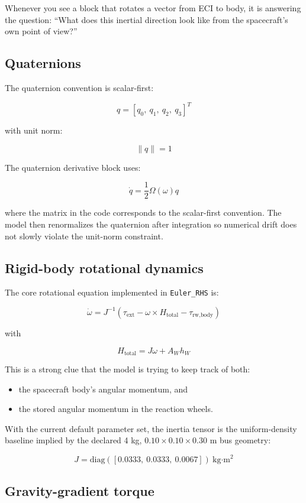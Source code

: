 \documentclass[11pt]{article}
\begin{document}
Whenever you see a block that rotates a vector from ECI to body, it is answering the question: ``What does this inertial direction look like from the spacecraft's own point of view?''

\subsection{Quaternions}

The quaternion convention is scalar-first:

\[
q = [q_0,\ q_1,\ q_2,\ q_3]^T
\]

with unit norm:

\[
\|q\| = 1
\]

The quaternion derivative block uses:

\[
\dot{q} = \frac{1}{2}\Omega(\omega)q
\]

where the matrix in the code corresponds to the scalar-first convention. The model then renormalizes the quaternion after integration so numerical drift does not slowly violate the unit-norm constraint.

\subsection{Rigid-body rotational dynamics}

The core rotational equation implemented in \texttt{Euler\_RHS} is:

\[
\dot{\omega} = J^{-1}\left(\tau_{\text{ext}} - \omega \times H_{\text{total}} - \tau_{\text{rw,body}}\right)
\]

with

\[
H_{\text{total}} = J\omega + A_W h_W
\]

This is a strong clue that the model is trying to keep track of both:

\begin{itemize}
\item the spacecraft body's angular momentum, and
\item the stored angular momentum in the reaction wheels.
\end{itemize}

With the current default parameter set, the inertia tensor is the uniform-density baseline implied by the declared 4 kg, \(0.10 \times 0.10 \times 0.30\) m bus geometry:

\[
J = \mathrm{diag}([0.0333,\ 0.0333,\ 0.0067]) \ \text{kg·m}^2
\]

\subsection{Gravity-gradient torque}
\end{document}
